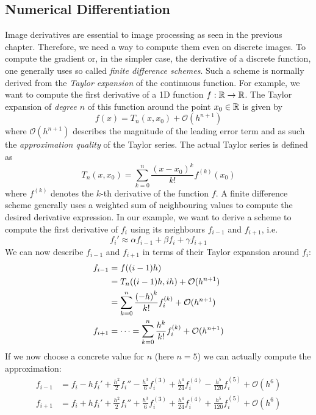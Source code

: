 \subsection{Numerical Differentiation}\label{sub:NumDiff}
Image derivatives are essential to image processing as seen in the previous chapter. 
Therefore, we need a way to compute them even on discrete images. To compute the 
gradient or, in the simpler case, the derivative of a discrete function, one 
generally uses so called \textit{finite difference schemes}. 
Such a scheme is normally derived from the \textit{Taylor expansion} of the continuous
function. For example, we want to compute the first derivative of a 1D function $f:\mathbb{R}
\rightarrow \mathbb{R}$.
The Taylor expansion of \textit{degree $n$} of this function around the point $x_0\in\mathbb{R}$ is given by 
\begin{equation}
    f(x) = T_n(x, x_0) + \mathcal{O}(h^{n+1})
\end{equation}
where $\mathcal{O}(h^{n+1})$ describes the magnitude of the leading error term and as such the
\textit{approximation quality} of the Taylor series.
The actual Taylor series is defined as
\begin{equation}
    T_n(x, x_0) = \sum\limits_{k=0}^{n} \frac{{(x-x_0)}^k}{k!}f^{(k)}(x_0)
\end{equation}
where $f^{(k)}$ denotes the $k$-th derivative of the function $f$.\newpage\noindent
A finite difference scheme generally uses a weighted sum of neighbouring values to compute the
desired derivative expression. In our example, we want to derive a scheme to compute the first
derivative of $f_i$ using its neighbours $f_{i-1}$ and $f_{i+1}$, i.e.
\begin{equation}
    f_i' \approx \alpha f_{i-1} + \beta f_i + \gamma f_{i+1}
\end{equation}
We can now describe $f_{i-1}$ and $f_{i+1}$ in terms of their Taylor expansion around $f_i$: 
\begin{align}
    f_{i-1} &= f((i-1)h) \notag\\
            &= T_n((i-1)h, ih) + \mathcal{O}(h^{n+1})\notag\\
            &= \sum\limits_{k=0}^{n}\frac{{(-h)}^k}{k!}f_i^{(k)}+ \mathcal{O}(h^{n+1})\\
    f_{i+1} &= \cdots = \sum\limits_{k=0}^{n}\frac{h^k}{k!}f_i^{(k)}+ \mathcal{O}(h^{n+1})
\end{align}
If we now choose a concrete value for $n$ (here $n=5$) we can actually compute the approximation:
\begin{align}
    f_{i-1} &= f_i - hf_i' + \frac{h^2}{2}f_i'' - \frac{h^3}{6}f_i^{(3)} + \frac{h^4}{24}f_i^{(4)} -
    \frac{h^5}{120}f_i^{(5)} + \mathcal{O}(h^6)\label{eq:fi-1}\\
    f_{i+1} &= f_i + hf_i' + \frac{h^2}{2}f_i'' + \frac{h^3}{6}f_i^{(3)} + \frac{h^4}{24}f_i^{(4)} +
    \frac{h^5}{120}f_i^{(5)} + \mathcal{O}(h^6)\label{eq:fi+1}
\end{align}
